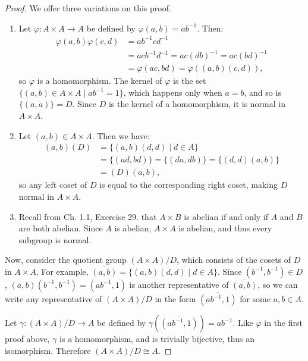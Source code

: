 \documentclass{article}
\begin{document}
\begin{proof}
    We offer three variations on this proof.
    
    \begin{enumerate}[itemsep=0em]
        \item Let $\varphi: A \times A \rightarrow A$ be defined by $\varphi(a, b) = ab^{-1}$. Then:
        \begin{align*}
            \varphi(a, b)\varphi(c, d) &= ab^{-1}cd^{-1} \\
                &= acb^{-1}d^{-1} = ac(db)^{-1} = ac(bd)^{-1} \\
                &= \varphi(ac, bd) = \varphi((a, b)(c, d)),
        \end{align*}
        so $\varphi$ is a homomorphism. The kernel of $\varphi$ is the set $\{ (a, b) \in A \times A \mid ab^{-1} = 1 \}$, which happens only when $a = b$, and so is $\{ (a, a) \} = D$. Since $D$ is the kernel of a homomorphism, it is normal in $A \times A$.
        \item Let $(a, b) \in A \times A$. Then we have:
            \begin{align*}
                (a, b)(D) &= \{ (a, b)(d, d) \mid d \in A \} \\
                &= \{ (ad, bd) \} = \{ (da, db) \} = \{ (d, d)(a, b) \} \\
                &= (D)(a, b),
            \end{align*}
            so any left coset of $D$ is equal to the corresponding right coset, making $D$ normal in $A \times A$.
        \item Recall from Ch. 1.1, Exercise 29. that $A \times B$ is abelian if and only if $A$ and $B$ are both abelian. Since $A$ is abelian, $A \times A$ is abelian, and thus every subgroup is normal.
    \end{enumerate}

    Now, consider the quotient group $(A \times A) / D$, which consists of the cosets of $D$ in $A \times A$. For example, $\overline{(a, b)} = \{ (a, b)(d, d) \mid d \in A \}$. Since $(b^{-1}, b^{-1}) \in D$, $(a, b)(b^{-1}, b^{-1}) = (ab^{-1}, 1)$ is another representative of $\overline{(a, b)}$, so we can write any representative of $(A \times A) / D$ in the form $\overline{(ab^{-1}, 1)}$ for some $a, b \in A$.

    Let $\gamma: (A \times A) / D \rightarrow A$ be defined by $\gamma(\overline{(ab^{-1}, 1)}) = ab^{-1}$. Like $\varphi$ in the first proof above, $\gamma$ is a homomorphism, and is trivially bijective, thus an isomorphism. Therefore $(A \times A) / D \cong A$.
\end{proof}
\end{document}
